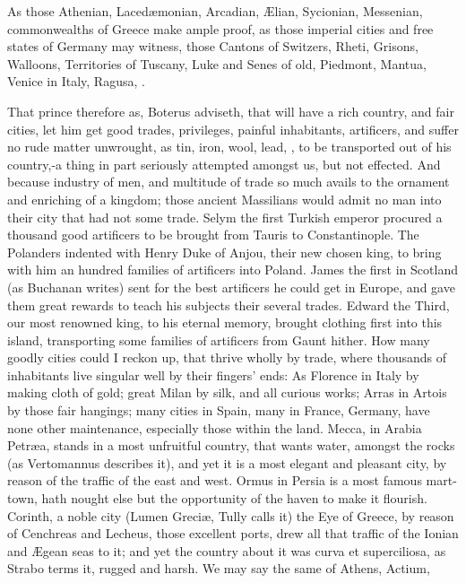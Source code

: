 {As those Athenian, Laced\ae{}monian, Arcadian, \AE{}lian, Sycionian,
Messenian, \etc{} commonwealths of Greece make ample proof, as those
imperial cities and free states of Germany may witness, those Cantons
of Switzers, Rheti, Grisons, Walloons, Territories of Tuscany, Luke and
Senes of old, Piedmont, Mantua, Venice in Italy, Ragusa, \etc{}.

That prince therefore as, Boterus adviseth, that will have a rich
country, and fair cities, let him get good trades, privileges, painful
inhabitants, artificers, and suffer no rude matter unwrought, as tin,
iron, wool, lead, \etc{}, to be transported out of his country,-a
thing in part seriously attempted amongst us, but not effected. And
because industry of men, and multitude of trade so much avails to the
ornament and enriching of a kingdom; those ancient Massilians
would admit no man into their city that had not some trade. Selym the
first Turkish emperor procured a thousand good artificers to be brought
from Tauris to Constantinople. The Polanders indented with Henry Duke
of Anjou, their new chosen king, to bring with him an hundred families
of artificers into Poland. James the first in Scotland (as
Buchanan writes) sent for the best artificers he could get in
Europe, and gave them great rewards to teach his subjects their several
trades. Edward the Third, our most renowned king, to his eternal
memory, brought clothing first into this island, transporting some
families of artificers from Gaunt hither. How many goodly cities could
I reckon up, that thrive wholly by trade, where thousands of
inhabitants live singular well by their fingers' ends: As Florence in
Italy by making cloth of gold; great Milan by silk, and all curious
works; Arras in Artois by those fair hangings; many cities in Spain,
many in France, Germany, have none other maintenance, especially those
within the land. Mecca, in Arabia Petr\ae{}a, stands in a most
unfruitful country, that wants water, amongst the rocks (as Vertomannus
describes it), and yet it is a most elegant and pleasant city, by
reason of the traffic of the east and west. Ormus in Persia is a most
famous mart-town, hath nought else but the opportunity of the haven to
make it flourish. Corinth, a noble city (Lumen Greci\ae{}, Tully calls it)
the Eye of Greece, by reason of Cenchreas and Lecheus, those excellent
ports, drew all that traffic of the Ionian and \AE{}gean seas to it; and
yet the country about it was curva et superciliosa, as Strabo
terms it, rugged and harsh. We may say the same of Athens, Actium,
}
